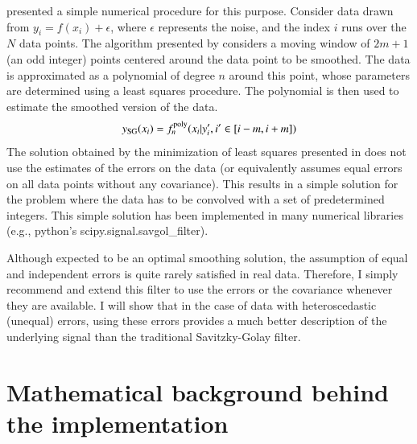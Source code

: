 \documentclass[iop, apj, onecolumn]{emulateapj}
\begin{document}
\citet{SG1964} presented a simple numerical procedure for this purpose. Consider
data drawn from $y_i=f(x_i)+\epsilon$, where $\epsilon$ represents the noise,
and the index $i$ runs over the $N$ data points. The algorithm presented by
\citet{SG1964} considers a moving window of $2m+1$ (an odd integer) points
centered around the data point to be smoothed. The data is approximated as a
polynomial of degree $n$ around this point, whose parameters are determined
using a least squares procedure. The polynomial is then used to estimate the
smoothed version of the data. 
\begin{equation}
        y_{\rm SG}(x_i) = f^{\rm poly}_{n}(x_i|{y_i', i'\in[i-m,i+m]})
\end{equation}
The solution obtained by the minimization of least squares presented in
\citet{SG1964} does not use the estimates of the errors on the data (or
equivalently assumes equal errors on all data points without any covariance).
This results in a simple solution for the problem where the data has to be
convolved with a set of predetermined integers. This simple solution has been
implemented in many numerical libraries (e.g., python's scipy.signal.savgol\_filter). 

Although expected to be an optimal smoothing solution, the assumption of equal and
independent errors is quite rarely satisfied in real data. Therefore, I simply
recommend and extend this filter to use the errors or the covariance whenever they are available.
I will show that in the case of data with heteroscedastic (unequal) errors,
using these errors provides a much better description of the underlying signal
than the traditional Savitzky-Golay filter.

\section{Mathematical background behind the implementation}
\end{document}
